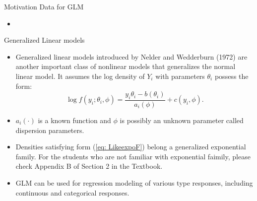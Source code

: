 \documentclass{beamer}
\begin{document}
     \begin{frame}{Motivation Data for GLM}
        \begin{itemize}
            \item 
        \end{itemize}
    \end{frame}
    
    
    \begin{frame}{Generalized Linear models}
        \begin{itemize}
            \item Generalized linear models introduced by Nelder and Wedderburn (1972) are another
important class of nonlinear models that generalizes the normal linear model. It assumes the log density of $Y_{i}$ with parameters $\theta_{i}$ possess the form:
            \begin{equation}
                \log f(y_{i};\theta_{i}, \phi) = \frac{y_{i}\theta_{i}-b(\theta_{i})}{a_{i}(\phi)} + c(y_{i}, \phi). \label{eq: LikeexpoF}
            \end{equation}
            \item $a_{i}(\cdot)$ is a known function  and $\phi$ is possibly an unknown parameter called dispersion parameters.
            \item Densities satisfying form (\ref{eq: LikeexpoF}) belong a generalized exponential family. For the students who are not familiar with exponential faimily, please check Appendix B of Section 2 in the Textbook.
            \item GLM can be used for regression modeling of various type responses, including continuous and categorical responses.
            
            
            
        \end{itemize}
    \end{frame}
    
    
\end{document}
